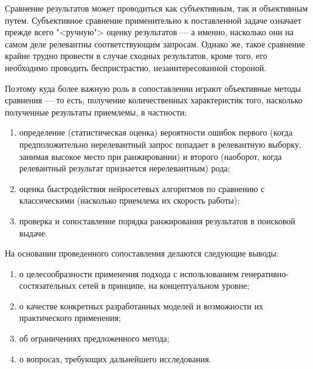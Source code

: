 Сравнение результатов может проводиться как субъективным, так и объективным путем. Субъективное сравнение применительно к поставленной задаче означает
прежде всего "<ручную"> оценку результатов --- а именно, насколько они на самом деле релевантны соответствующим запросам. Однако же, такое сравнение
крайне трудно провести в случае сходных результатов, кроме того, его необходимо проводить беспристрастно, незаинтересованной стороной.

Поэтому куда более важную роль в сопоставлении играют объективные методы сравнения --- то есть, получение количественных характеристик того,
насколько полученные результаты приемлемы, в частности:
\begin{enumerate}[1)]
    \item определение (статистическая оценка) вероятности ошибок первого (когда предположительно нерелевантный запрос попадает в релевантную
          выборку, занимая высокое место при ранжировании) и второго (наоборот, когда релевантный результат признается нерелевантным) рода; 
    \item оценка быстродействия нейросетевых алгоритмов по сравнению с классическими (насколько приемлема их скорость работы);
    \item проверка и сопоставление порядка ранжирования результатов в поисковой выдаче.
\end{enumerate}

На основании проведенного сопоставления делаются следующие выводы:
\begin{enumerate}[1)]
    \item о целесообразности применения подхода с использованием генеративно-состязательных сетей в принципе, на концептуальном уровне;
    \item о качестве конкретных разработанных моделей и возможности их практического применения;
    \item об ограничениях предложенного метода;
    \item о вопросах, требующих дальнейшего исследования.
\end{enumerate}
